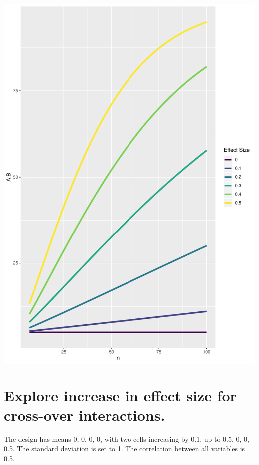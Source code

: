 \documentclass[]{book}
\begin{document}
\includegraphics{SuperpowerValidation_files/figure-latex/unnamed-chunk-217-1.pdf}

\hypertarget{explore-increase-in-effect-size-for-cross-over-interactions.}{%
\section{Explore increase in effect size for cross-over interactions.}\label{explore-increase-in-effect-size-for-cross-over-interactions.}}

The design has means 0, 0, 0, 0, with two cells increasing by 0.1, up to 0.5, 0, 0, 0.5. The standard deviation is set to 1. The correlation between all variables is 0.5.
\end{document}
